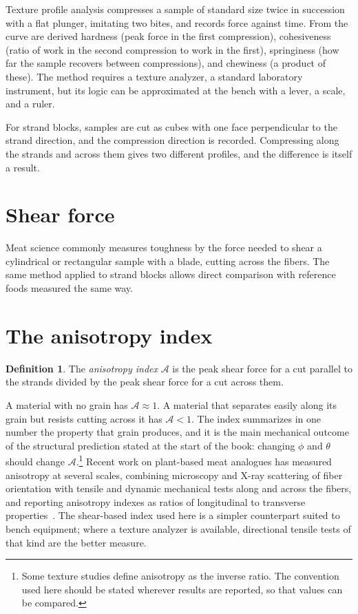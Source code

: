 \documentclass[11pt,openany]{book}
\theoremstyle{definition}
\newtheorem{definition}{Definition}[chapter]
\begin{document}
Texture profile analysis compresses a sample of standard size twice in succession with a flat plunger, imitating two bites, and records force against time. From the curve are derived hardness (peak force in the first compression), cohesiveness (ratio of work in the second compression to work in the first), springiness (how far the sample recovers between compressions), and chewiness (a product of these). The method requires a texture analyzer, a standard laboratory instrument, but its logic can be approximated at the bench with a lever, a scale, and a ruler.

For strand blocks, samples are cut as cubes with one face perpendicular to the strand direction, and the compression direction is recorded. Compressing along the strands and across them gives two different profiles, and the difference is itself a result.

\section{Shear force}

Meat science commonly measures toughness by the force needed to shear a cylindrical or rectangular sample with a blade, cutting across the fibers. The same method applied to strand blocks allows direct comparison with reference foods measured the same way.

\section{The anisotropy index}

\begin{definition}
The \emph{anisotropy index} $\mathcal{A}$ is the peak shear force for a cut parallel to the strands divided by the peak shear force for a cut across them.
\end{definition}

A material with no grain has $\mathcal{A} \approx 1$. A material that separates easily along its grain but resists cutting across it has $\mathcal{A} < 1$. The index summarizes in one number the property that grain produces, and it is the main mechanical outcome of the structural prediction stated at the start of the book: changing $\phi$ and $\theta$ should change $\mathcal{A}$.\footnote{Some texture studies define anisotropy as the inverse ratio. The convention used here should be stated wherever results are reported, so that values can be compared.} Recent work on plant-based meat analogues has measured anisotropy at several scales, combining microscopy and X-ray scattering of fiber orientation with tensile and dynamic mechanical tests along and across the fibers, and reporting anisotropy indexes as ratios of longitudinal to transverse properties~\cite{zink2024}. The shear-based index used here is a simpler counterpart suited to bench equipment; where a texture analyzer is available, directional tensile tests of that kind are the better measure.
\end{document}
